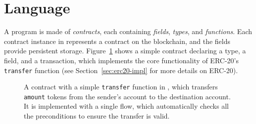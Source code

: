 \documentclass[nonacm, dvipsnames, sigconf]{acmart}
\begin{document}
\section{Language}\label{sec:lang}
A \langName program is made of \emph{contracts}, each containing \emph{fields}, \emph{types}, and \emph{functions}.
Each contract instance in \langName represents a contract on the blockchain, and the fields provide persistent storage.
Figure~\ref{fig:erc20-transfer-flow} shows a simple contract declaring a type, a field, and a transaction, which implements the core functionality of ERC-20's \lstinline{transfer} function (see Section~\ref{sec:erc20-impl} for more details on ERC-20).
\begin{figure}[ht]
    \centering
    
    \caption{A contract with a simple \lstinline{transfer} function in \langName, which transfers \lstinline{amount} tokens from the sender's account to the destination account.
It is implemented with a single flow, which automatically checks all the preconditions to ensure the transfer is valid.}
    \label{fig:erc20-transfer-flow}
\end{figure}
\end{document}
